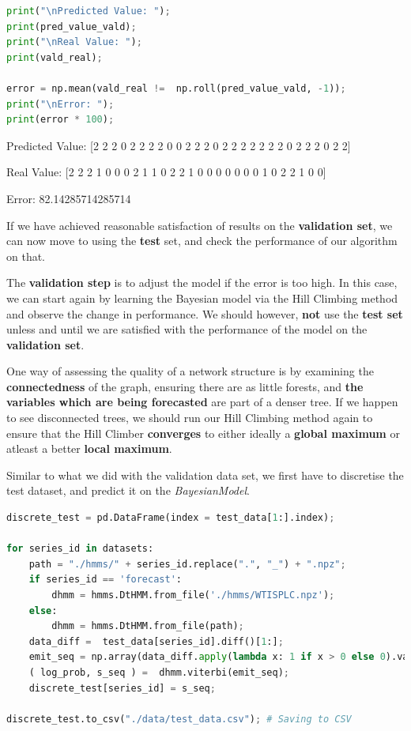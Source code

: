 \begin{lstlisting}[language=Python]
print("\nPredicted Value: ");
print(pred_value_vald);
print("\nReal Value: ");
print(vald_real);

error = np.mean(vald_real !=  np.roll(pred_value_vald, -1));
print("\nError: ");
print(error * 100);
\end{lstlisting}

Predicted Value: {[}2 2 2 0 2 2 2 2 0 0 2 2 2 0 2 2 2 2 2 2 2 0 2 2 2 0
2 2{]}

Real Value: {[}2 2 2 1 0 0 0 2 1 1 0 2 2 1 0 0 0 0 0 0 0 1 0 2 2 1 0
0{]}

Error: 82.14285714285714

If we have achieved reasonable satisfaction of results on the
\textbf{validation set}, we can now move to using the \textbf{test} set,
and check the performance of our algorithm on that.

The \textbf{validation step} is to adjust the model if the error is too
high. In this case, we can start again by learning the Bayesian model
via the Hill Climbing method and observe the change in performance. We
should however, \textbf{not} use the \textbf{test set} unless and until
we are satisfied with the performance of the model on the
\textbf{validation set}.

One way of assessing the quality of a network structure is by examining
the \textbf{connectedness} of the graph, ensuring there are as little
forests, and \textbf{the variables which are being forecasted} are part
of a denser tree. If we happen to see disconnected trees, we should run
our Hill Climbing method again to ensure that the Hill Climber
\textbf{converges} to either ideally a \textbf{global maximum} or
atleast a better \textbf{local maximum}.

Similar to what we did with the validation data set, we first have to
discretise the test dataset, and predict it on the \emph{BayesianModel}.

\begin{lstlisting}[language=Python]
discrete_test = pd.DataFrame(index = test_data[1:].index);

for series_id in datasets:
    path = "./hmms/" + series_id.replace(".", "_") + ".npz";
    if series_id == 'forecast':
        dhmm = hmms.DtHMM.from_file('./hmms/WTISPLC.npz');
    else:
        dhmm = hmms.DtHMM.from_file(path);
    data_diff =  test_data[series_id].diff()[1:];
    emit_seq = np.array(data_diff.apply(lambda x: 1 if x > 0 else 0).values);
    ( log_prob, s_seq ) =  dhmm.viterbi(emit_seq);
    discrete_test[series_id] = s_seq;

discrete_test.to_csv("./data/test_data.csv"); # Saving to CSV
\end{lstlisting}

